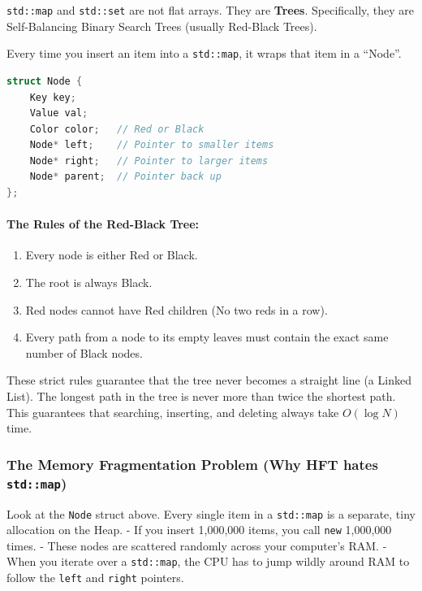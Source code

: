\passthrough{\lstinline!std::map!} and
\passthrough{\lstinline!std::set!} are not flat arrays. They are
\textbf{Trees}. Specifically, they are Self-Balancing Binary Search
Trees (usually Red-Black Trees).

Every time you insert an item into a \passthrough{\lstinline!std::map!},
it wraps that item in a ``Node''.

\begin{lstlisting}[language={C++}]
struct Node {
    Key key;
    Value val;
    Color color;   // Red or Black
    Node* left;    // Pointer to smaller items
    Node* right;   // Pointer to larger items
    Node* parent;  // Pointer back up
};
\end{lstlisting}

\hypertarget{the-rules-of-the-red-black-tree}{%
\paragraph{The Rules of the Red-Black
Tree:}\label{the-rules-of-the-red-black-tree}}

\begin{enumerate}
\def\labelenumi{\arabic{enumi}.}
\tightlist
\item
  Every node is either Red or Black.
\item
  The root is always Black.
\item
  Red nodes cannot have Red children (No two reds in a row).
\item
  Every path from a node to its empty leaves must contain the exact same
  number of Black nodes.
\end{enumerate}

These strict rules guarantee that the tree never becomes a straight line
(a Linked List). The longest path in the tree is never more than twice
the shortest path. This guarantees that searching, inserting, and
deleting always take \textbf{\(O(\log N)\)} time.

\hypertarget{the-memory-fragmentation-problem-why-hft-hates-stdmap}{%
\subsubsection{\texorpdfstring{The Memory Fragmentation Problem (Why HFT
hates
\texttt{std::map})}{The Memory Fragmentation Problem (Why HFT hates std::map)}}\label{the-memory-fragmentation-problem-why-hft-hates-stdmap}}

Look at the \passthrough{\lstinline!Node!} struct above. Every single
item in a \passthrough{\lstinline!std::map!} is a separate, tiny
allocation on the Heap. - If you insert 1,000,000 items, you call
\passthrough{\lstinline!new!} 1,000,000 times. - These nodes are
scattered randomly across your computer's RAM. - When you iterate over a
\passthrough{\lstinline!std::map!}, the CPU has to jump wildly around
RAM to follow the \passthrough{\lstinline!left!} and
\passthrough{\lstinline!right!} pointers.

